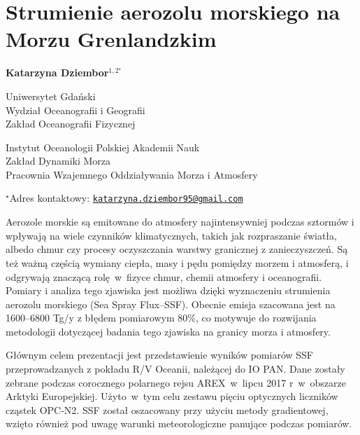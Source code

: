 \documentclass[\main/boa.tex]{subfiles}
\begin{document}
\sloppy

\section{Strumienie aerozolu morskiego na Morzu Grenlandzkim }

\begin{center}
  {\bf {} Katarzyna Dziembor$^{1,2^\star}$ }
\end{center}

\vskip 0.3cm

\begin{affiliations}
\begin{enumerate}
\begin{minipage}{0.915\textwidth}
\centering
\item Uniwersytet Gdański\\ Wydział Oceanografii i Geografii\\ Zakład Oceanografii Fizycznej
\item Instytut Oceanologii Polskiej Akademii Nauk \\ Zakład Dynamiki Morza \\ Pracownia Wzajemnego Oddziaływania Morza i Atmosfery\\[-2pt]
\end{minipage}
\end{enumerate}
$^\star$Adres kontaktowy: \href{mailto:katarzyna.dziembor95@gmail.com}{\nolinkurl{katarzyna.dziembor95@gmail.com}}\\
\end{affiliations}

\vskip 0.5cm


\vskip 0.5cm

Aerozole morskie są emitowane do atmosfery najintensywniej podczas sztormów i wpływają na wiele czynników klimatycznych, takich jak rozpraszanie światła, albedo chmur czy procesy oczyszczania warstwy granicznej z zanieczyszczeń. Są też ważną częścią wymiany ciepła, masy i pędu pomiędzy morzem i atmosferą, i odgrywają znaczącą rolę~w~fizyce chmur, chemii atmosfery i oceanografii. Pomiary i analiza tego zjawiska jest możliwa dzięki wyznaczeniu strumienia aerozolu morskiego (Sea Spray Flux--SSF). Obecnie emisja szacowana jest na 1600–6800 Tg/y z błędem pomiarowym 80\%, co motywuje do rozwijania metodologii dotyczącej badania tego zjawiska na granicy morza i atmosfery. 

Głównym celem prezentacji jest przedstawienie wyników pomiarów SSF przeprowadzanych z pokładu R/V Oceanii, należącej do IO PAN. Dane zostały zebrane podczas corocznego polarnego rejsu AREX~w~lipcu 2017 r~w~obszarze Arktyki Europejskiej. Użyto~w~tym celu zestawu pięciu optycznych liczników cząstek OPC-N2. SSF został oszacowany przy użyciu metody gradientowej, wzięto również pod uwagę warunki meteorologiczne panujące podczas pomiarów.
\end{document}
